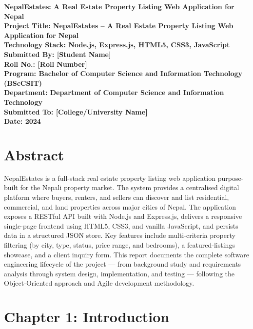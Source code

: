 \documentclass[12pt,a4paper]{report}
\begin{document}
\begin{titlepage}
\centering
{\Large\bfseries NepalEstates: A Real Estate Property Listing Web Application for Nepal}\\[1cm]
\textbf{Project Title: NepalEstates -- A Real Estate Property Listing Web Application for Nepal}\\[0.5cm]
\textbf{Technology Stack: Node.js, Express.js, HTML5, CSS3, JavaScript}\\[0.5cm]
\vfill
\textbf{Submitted By: [Student Name]}\\
\textbf{Roll No.: [Roll Number]}\\
\textbf{Program: Bachelor of Computer Science and Information Technology (BScCSIT)}\\
\textbf{Department: Department of Computer Science and Information Technology}\\
\textbf{Submitted To: [College/University Name]}\\
\textbf{Date: 2024}\\
\end{titlepage}
\newpage
\chapter*{Abstract}
NepalEstates is a full-stack real estate property listing web application purpose-built for the Nepali property market. The system provides a centralised digital platform where buyers, renters, and sellers can discover and list residential, commercial, and land properties across major cities of Nepal. The application exposes a RESTful API built with Node.js and Express.js, delivers a responsive single-page frontend using HTML5, CSS3, and vanilla JavaScript, and persists data in a structured JSON store. Key features include multi-criteria property filtering (by city, type, status, price range, and bedrooms), a featured-listings showcase, and a client inquiry form. This report documents the complete software engineering lifecycle of the project --- from background study and requirements analysis through system design, implementation, and testing --- following the Object-Oriented approach and Agile development methodology.

\tableofcontents
\newpage
\chapter{Chapter 1: Introduction}
\end{document}
